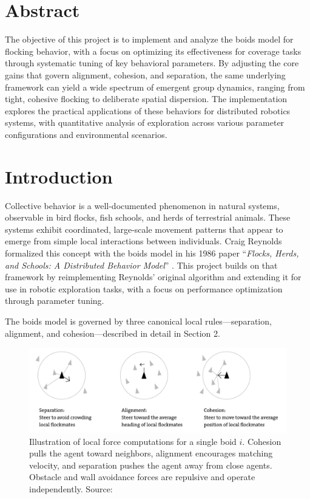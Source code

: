 \documentclass[12pt]{article}
\begin{document}
\setlength{\parindent}{0pt}
\setlength{\parskip}{0.25em}
\section*{Abstract}

The objective of this project is to implement and analyze the boids model for flocking behavior, with a focus on optimizing its effectiveness for coverage tasks through systematic tuning of key behavioral parameters. By adjusting the core gains that govern alignment, cohesion, and separation, the same underlying framework can yield a wide spectrum of emergent group dynamics, ranging from tight, cohesive flocking to deliberate spatial dispersion. The implementation explores the practical applications of these behaviors for distributed robotics systems, with quantitative analysis of exploration across various parameter configurations and environmental scenarios.

\section{Introduction}

Collective behavior is a well-documented phenomenon in natural systems, observable in bird flocks, fish schools, and herds of terrestrial animals. These systems exhibit coordinated, large-scale movement patterns that appear to emerge from simple local interactions between individuals. Craig Reynolds formalized this concept with the boids model in his 1986 paper ``\emph{Flocks, Herds, and Schools: A Distributed Behavior Model}'' \cite{reynolds1987flocks}. This project builds on that framework by reimplementing Reynolds' original algorithm and extending it for use in robotic exploration tasks, with a focus on performance optimization through parameter tuning.

The boids model is governed by three canonical local rules—separation, alignment, and cohesion—described in detail in Section 2.

\begin{figure}[h!]
    \centering
    \includegraphics[width=0.7\linewidth]{force_diagram.png}
    \caption{Illustration of local force computations for a single boid \(i\). Cohesion pulls the agent toward neighbors, alignment encourages matching velocity, and separation pushes the agent away from close agents. Obstacle and wall avoidance forces are repulsive and operate independently. Source: \cite{martinez2023boids}}
    \label{fig:force_diagram}
  \end{figure}
\end{document}
